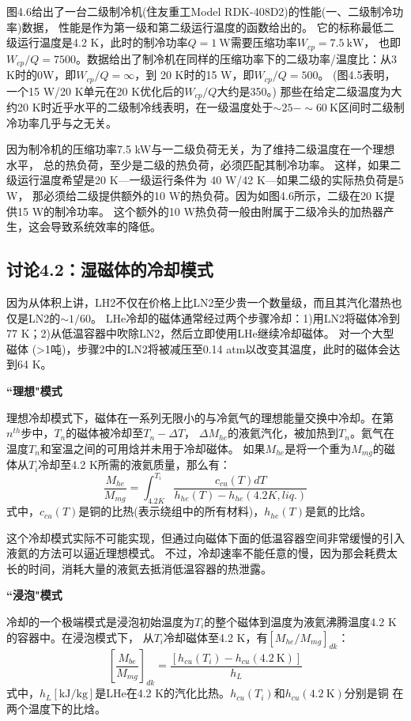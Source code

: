 图4.6给出了一台二级制冷机(住友重工Model RDK-408D2)的性能(一、二级制冷功率)数据，
性能是作为第一级和第二级运行温度的函数给出的。
它的标称最低二级运行温度是4.2 K，此时的制冷功率$Q=1\ \mathrm{W}$需要压缩功率$W_{cp}=7.5\ \mathrm{kW}$，
也即$W_{cp}/Q = 7500$。数据给出了制冷机在同样的压缩功率下的二级功率/温度比：从3 K时的0W，即$W_{cp}/Q = \infty$，到
20 K时的15 W，即$W_{cp}/Q = 500$。 (图4.5表明，一个15 W/20 K单元在20 K优化后的$W_{cp}/Q$大约是350。)
那些在给定二级温度为大约20 K时近乎水平的二级制冷线表明，在一级温度处于$\sim 25-\sim 60\ \mathrm{K}$区间时二级制冷功率几乎与之无关。

因为制冷机的压缩功率7.5 kW与一二级负荷无关，为了维持二级温度在一个理想水平，
总的热负荷，至少是二级的热负荷，必须匹配其制冷功率。
这样，如果二级运行温度希望是20 K---一级运行条件为 40 W/42 K---如果二级的实际热负荷是5 W，
那必须给二级提供额外的10 W的热负荷。因为如图4.6所示，二级在20 K提供15 W的制冷功率。
这个额外的10 W热负荷一般由附属于二级冷头的加热器产生，这会导致系统效率的降低。


\subsection{讨论4.2：湿磁体的冷却模式}
因为从体积上讲，LH2不仅在价格上比LN2至少贵一个数量级，而且其汽化潜热也仅是LN2的$\sim 1/60$。
LHe冷却的磁体通常经过两个步骤冷却：1)用LN2将磁体冷到77 K；2)从低温容器中吹除LN2，然后立即使用LHe继续冷却磁体。
对一个大型磁体 (>1吨)，步骤2中的LN2将被减压至0.14 atm以改变其温度，此时的磁体会达到64 K。

\textbf{``理想"模式}

理想冷却模式下，磁体在一系列无限小的与冷氦气的理想能量交换中冷却。在第$n^{th}$步中，$T_n$的磁体被冷却至$T_n-\Delta T$，
$\Delta M_{he}$的液氦汽化，被加热到$T_n$。氦气在温度$T_n$和室温之间的可用焓并未用于冷却磁体。
如果$M_{he}$是将一个重为$M_{mg}$的磁体从$T_i$冷却至4.2 K所需的液氦质量，那么有：
\begin{equation}%
\frac{M_{he}}{M_{mg}}=\int_{4.2K}^{T_i}\frac{c_{cu}(T)dT}{h_{he}(T)-h_{he}(4.2K,liq.)}
\end{equation}
式中，$c_{cu}(T)$是铜的比热(表示绕组中的所有材料)，$h_{he}(T)$是氦的比焓。

这个冷却模式实际不可能实现，但通过向磁体下面的低温容器空间非常缓慢的引入液氦的方法可以逼近理想模式。
不过，冷却速率不能任意的慢，因为那会耗费太长的时间，消耗大量的液氦去抵消低温容器的热泄露。

\textbf{``浸泡"模式}

冷却的一个极端模式是浸泡初始温度为$T_i$的整个磁体到温度为液氦沸腾温度4.2 K的容器中。在浸泡模式下，
从$T_i$冷却磁体至4.2 K，有$[M_{he}/M_{mg}]_{dk}$：
\begin{equation}%
\left[\frac{M_{be}}{M_{mg}}\right]_{dk}=\frac{[h_{cu}(T_i)-h_{cu}(4.2\ \mathrm{K})]}{h_L}
\end{equation}
式中，$h_L[\mathrm{kJ/kg}]$是LHe在4.2 K的汽化比热。$h_{cu}(T_i)$和$h_{cu}(4.2\ \mathrm{K})$分别是铜
在两个温度下的比焓。

